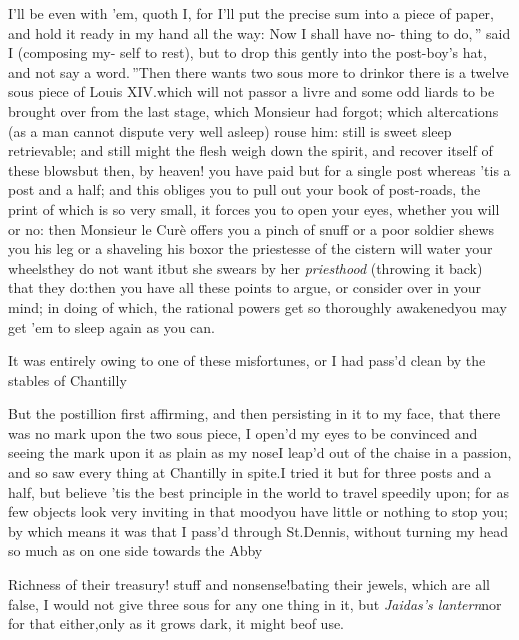 \documentclass{article}
\begin{document}
\newpage
\tsh I’ll be even with ’em, quoth I,\break
for I’ll put the precise sum into a piece\break
of paper, and hold it ready in my hand\break
all the way: \lqq Now I shall have no-\break
\lqq thing to do,\,” said I (composing my-\break
self to rest), \lqq but to drop this gently\break
\lqq into the post-boy’s hat, and not say\break
\lqq a word.\,”\tsh Then there wants two\break
sous more to drink\tsh or there is a
twelve sous piece of Louis XIV.\@ which will not pass\tsk or a livre and some odd liards
to be brought over from the last stage, which Monsieur had forgot; which
altercations (as a man cannot dispute very well asleep) rouse him: still is sweet
sleep retrievable; and still might the flesh weigh down the spirit, and recover
itself of these blows\tsk but then, by heaven!\pb
you have paid but for a single post\break
\tsk whereas ’tis a post and a half; and this obliges you to pull out your book of
post-roads, the print of which is so very small, it forces you to open your eyes,
whether you will or no: then Monsieur le Curè offers you a pinch of snuff\tsh\break
or a poor soldier shews you his leg\tsh\break
or a shaveling his box\tsh or the priestesse of the
cistern will water your wheels\break\tsh they do not want it\tsh but she\break
swears by her \textit{priesthood} (throwing it back) that they do:\tsh then you have all these
points to argue, or consider over in your mind; in doing of which, the rational
powers get so thoroughly awakened\tsh you may get ’em to sleep again as you can.

\newpage
It was entirely owing to one of these misfortunes, or I had
pass’d clean by the stables of
Chantilly\tsh

\tsh But the postillion first affirming, and then
persisting in it to my face, that there was no mark upon the two
sous piece, I open’d my eyes to be convinced\break
\tsk and seeing
the mark upon it as plain as my nose\tsk I leap’d out of
the chaise in a passion, and so saw every thing at Chantilly
in spite.\tsh I tried it but for three posts and a half,
but believe ’tis the best principle in the world to travel
speedily upon; for as few objects look very inviting in that
mood\tsk you have little or nothing to stop you; by which means
it was that I pass’d through St.\pb Dennis, without turning my
head so much as on one side towards the Abby\tsh

\tsh Richness of their treasury! stuff and nonsense!\tsh bating their jewels, which are
all false, I would not give three sous for any one thing in it, but \textit{Jaidas’s
lantern}\tsh nor for that either,\break only as it grows dark, it might be\break of use.
\end{document}
